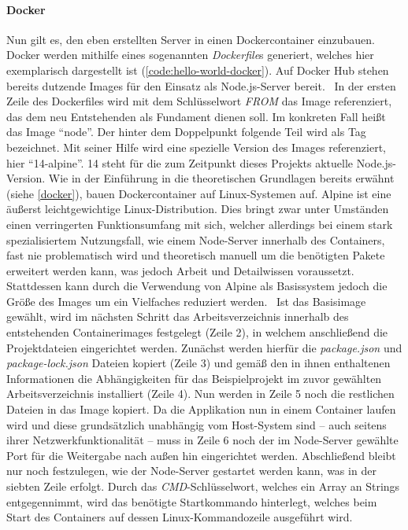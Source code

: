 \paragraph{Docker}
Nun gilt es, den eben erstellten Server in einen Dockercontainer einzubauen.
Docker werden mithilfe eines sogenannten \emph{Dockerfile}s generiert, welches hier exemplarisch dargestellt ist (\autoref{code:hello-world-docker}).
Auf Docker Hub stehen bereits dutzende Images für den Einsatz als Node.js-Server bereit.~\cite{dockerhub-node}
In der ersten Zeile des Dockerfiles wird mit dem Schlüsselwort \emph{FROM} das Image referenziert, das dem neu Entstehenden als Fundament dienen soll.
Im konkreten Fall heißt das Image \enquote{node}.
Der hinter dem Doppelpunkt folgende Teil wird als Tag bezeichnet.
Mit seiner Hilfe wird eine spezielle Version des Images referenziert, hier \enquote{14-alpine}.
14 steht für die zum Zeitpunkt dieses Projekts aktuelle Node.js-Version.
Wie in der Einführung in die theoretischen Grundlagen bereits erwähnt (siehe \autoref{docker}), bauen Dockercontainer auf Linux-Systemen auf.
Alpine ist eine äußerst leichtgewichtige Linux-Distribution.
Dies bringt zwar unter Umständen einen verringerten Funktionsumfang mit sich, welcher allerdings bei einem stark spezialisiertem Nutzungsfall, wie einem Node-Server innerhalb des Containers, fast nie problematisch wird und theoretisch manuell um die benötigten Pakete erweitert werden kann, was jedoch Arbeit und Detailwissen voraussetzt.
Stattdessen kann durch die Verwendung von Alpine als Basissystem jedoch die Größe des Images um ein Vielfaches reduziert werden.~\cite{Bailey2017}
Ist das Basisimage gewählt, wird im nächsten Schritt das Arbeitsverzeichnis innerhalb des entstehenden Containerimages festgelegt (Zeile 2), in welchem anschließend die Projektdateien eingerichtet werden.
Zunächst werden hierfür die \emph{package.json} und \emph{package-lock.json} Dateien kopiert (Zeile 3) und gemäß den in ihnen enthaltenen Informationen die Abhängigkeiten für das Beispielprojekt im zuvor gewählten Arbeitsverzeichnis installiert (Zeile 4).
Nun werden in Zeile 5 noch die restlichen Dateien in das Image kopiert.
Da die Applikation nun in einem Container laufen wird und diese grundsätzlich unabhängig vom Host-System sind -- auch seitens ihrer Netzwerkfunktionalität -- muss in Zeile 6 noch der im Node-Server gewählte Port für die Weitergabe nach außen hin eingerichtet werden.
Abschließend bleibt nur noch festzulegen, wie der Node-Server gestartet werden kann, was in der siebten Zeile erfolgt.
Durch das \emph{CMD}-Schlüsselwort, welches ein Array an Strings entgegennimmt, wird das benötigte Startkommando hinterlegt, welches beim Start des Containers auf dessen Linux-Kommandozeile ausgeführt wird.




